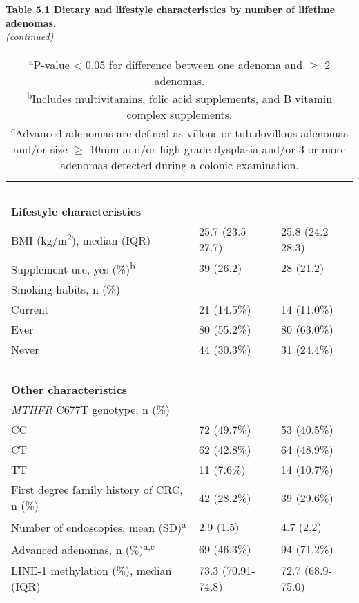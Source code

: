 \begin{table}
\caption*{{\bf{Table 5.1} Dietary and lifestyle characteristics by number of lifetime adenomas.} \\\emph{(continued)}}
\label{table5_1}
\begin{adjustbox}{width=\textwidth}
\renewcommand{\arraystretch}{1.1}
\begin{tabular}{L{6.4cm}C{3cm}C{3cm}}
~ & ~ & ~ \\
\bfseries Lifestyle characteristics & ~ & ~ \\
{BMI (kg/m}{\textsuperscript{2}}{), median (IQR)} & 25.7 (23.5-27.7) & 25.8 (24.2-28.3)\\
Supplement use, yes (\%)\textsuperscript{b} & 39 (26.2) & 28 (21.2)\\
{Smoking habits, n (\%)} & ~ & ~\\
\quad Current & 21 (14.5\%) & 14 (11.0\%) \\
\quad Ever & 80 (55.2\%) & 80 (63.0\%) \\
\quad Never & 44 (30.3\%) & 31 (24.4\%) \\
~ & ~ & ~ \\
\bfseries Other characteristics & ~ & ~ \\
{\textit{MTHFR}}{ C677T genotype, n (\%)}\\
\quad CC & 72 (49.7\%) & 53 (40.5\%)\\
\quad CT & 62 (42.8\%) & 64 (48.9\%)\\
\quad TT & 11 (7.6\%) & 14 (10.7\%)\\
First degree family history of CRC, n (\%) & 42 (28.2\%) & 39 (29.6\%)\\
Number of endoscopies, mean (SD)\textsuperscript{a} & 2.9 (1.5) & 4.7 (2.2)\\
Advanced adenomas, n (\%)\textsuperscript{a,c} & 69 (46.3\%) & 94 (71.2\%)\\
LINE-1 methylation (\%), median (IQR) & 73.3 (70.91-74.8) & 72.7 (68.9-75.0)\\
\hline
\end{tabular}
\end{adjustbox}
\caption*{\footnotesize{\textsuperscript{a}P-value < 0.05 for difference between one adenoma and $\geq$ 2 adenomas. \\ \textsuperscript{b}Includes multivitamins, folic acid supplements, and B vitamin complex supplements. \\ \textsuperscript{c}Advanced adenomas are defined as villous or tubulovillous adenomas and/or size $\geq$ 10mm and/or high-grade dysplasia and/or 3 or more adenomas detected during a colonic examination.}}
\end{table}


